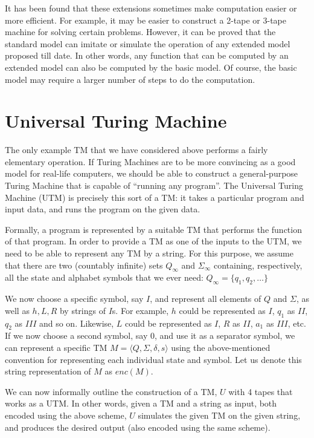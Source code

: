 \documentclass[12pt]{article}
\begin{document}
It has been  found that these extensions sometimes  make computation easier
or more efficient.  For example, it may be easier to  construct a 2-tape or
3-tape machine for solving certain problems. However, it can be proved that
the standard  model can imitate or  simulate the operation  of any extended
model proposed till date. In other words, any function that can be computed
by an  extended model can also be  computed by the basic  model. Of course,
the basic model may require a larger number of steps to do the computation.


\section{Universal Turing Machine}
The  only  example TM  that  we have  considered  above  performs a  fairly
elementary operation.   If Turing Machines are  to be more  convincing as a
good  model for  real-life  computers, we  should  be able  to construct  a
general-purpose   Turing  Machine   that  is   capable  of   ``running  any
program''. The Universal  Turing Machine (UTM) is precisely  this sort of a
TM: it takes  a particular program and input data, and  runs the program on
the given data.

Formally,  a program  is represented  by a  suitable TM  that  performs the
function of that program. In order to  provide a TM as one of the inputs to
the UTM,  we need to  be able to  represent any TM  by a string.   For this
purpose, we assume that there  are two (countably infinite) sets $Q_\infty$
and  $\Sigma_\infty$ containing,  respectively, all  the state  and alphabet
symbols that we ever need:
\begin{math}
Q_\infty = \{ q_1, q_2, \ldots \}
 
\end{math}

We now choose a specific symbol, say $I$, and represent all elements of $ Q $
and $\Sigma $,  as well as $h,  L, R$ by  strings of $I$s. For  example, $h$
could  be  represented  as $I$,  $q_1$  as  $II$,  $q_2$  as $III$  and  so
on. Likewise, $L$ could be represented as $I$, $R$ as $II$, $a_1$ as $III$,
etc. If we now  choose a second symbol, say $0$, and  use it as a separator
symbol, we  can represent a specific TM  $M = \langle Q,  \Sigma , \delta , s  \rangle $ 
  using  the   above-mentioned  convention  for  representing  each
individual state and symbol. Let us denote this string representation of $M$
as $enc(M)$.

We can now informally outline the construction of a TM, $U$ with 4 tapes
that works as a UTM. In other words, given a TM and a string as input, both
encoded using  the above scheme,  $U$ simulates the  given TM on  the given
string,  and produces  the  desired  output (also  encoded  using the  same
scheme).
\end{document}
